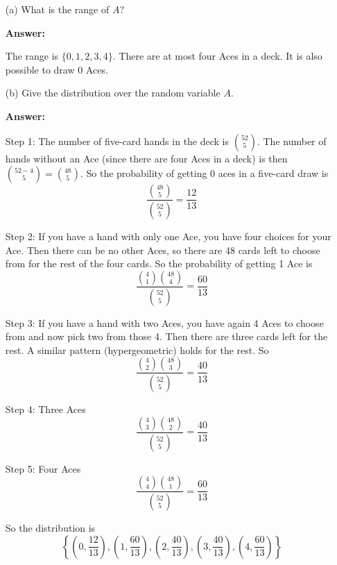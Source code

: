 \documentclass[14pt]{extreport}
\newcommand{\answer}[0]{\medskip \textbf{Answer:} \medskip}
\begin{document}
\begin{enumerate}

    \item[(a)] What is the range of \( A \)?
    
        \answer

        The range is \( \{ 0, 1, 2, 3, 4 \} \). There are at most four Aces in a deck. It is also possible to draw 0 Aces.

    \item[(b)] Give the distribution over the random variable \( A \).
    
        \answer

        Step 1: The number of five-card hands in the deck is \( \binom{52}{5} \). The number of hands without an Ace (since there are four Aces in a deck) is then \( \binom{52 - 4}{5} = \binom{48}{5} \). So the probability of getting 0 aces in a five-card draw is 
        \[ \frac{\binom{48}{5}}{\binom{52}{5}} = \frac{12}{13} \]

        \bigskip

        Step 2: If you have a hand with only one Ace, you have four choices for your Ace. Then there can be no other Aces, so there are 48 cards left to choose from for the rest of the four cards. So the probability of getting 1 Ace is 
        \[ \frac{\binom{4}{1} \binom{48}{4}}{\binom{52}{5}} = \frac{60}{13} \]

        \bigskip

        Step 3: If you have a hand with two Aces, you have again 4 Aces to choose from and now pick two from those 4. Then there are three cards left for the rest. A similar pattern (hypergeometric) holds for the rest. So 
        \[
            \frac{\binom{4}{2} \binom{48}{3}}{\binom{52}{5}} = \frac{40}{13}
        \]

        \bigskip

        Step 4: Three Aces
        \[
            \frac{\binom{4}{3} \binom{48}{2}}{\binom{52}{5}} = \frac{40}{13}
        \]

        \bigskip

        Step 5: Four Aces
        \[
            \frac{\binom{4}{4} \binom{48}{1}}{\binom{52}{5}} = \frac{60}{13}
        \]

        So the distribution is
        \[
            \left\{ 
                \left( 0, \frac{12}{13} \right),
                \left( 1, \frac{60}{13} \right),
                \left( 2, \frac{40}{13} \right),
                \left( 3, \frac{40}{13} \right),
                \left( 4, \frac{60}{13} \right)
            \right\}
        \]

\end{enumerate}
\end{document}
